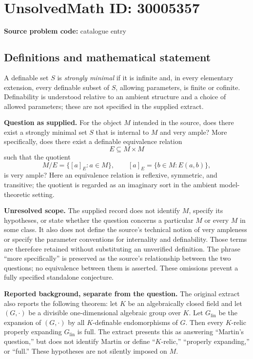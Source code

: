 \documentclass[11pt]{article}
\begin{document}
\section*{UnsolvedMath ID: 30005357}
\textbf{Source problem code:} catalogue entry
\subsection{Definitions and mathematical statement}
A definable set \(S\) is \emph{strongly minimal} if it is infinite and, in every elementary extension, every definable subset of \(S\), allowing parameters, is finite or cofinite. Definability is understood relative to an ambient structure and a choice of allowed parameters; these are not specified in the supplied extract.

\textbf{Question as supplied.} For the object \(M\) intended in the source, does there exist a strongly minimal set \(S\) that is internal to \(M\) and very ample? More specifically, does there exist a definable equivalence relation
\[
E\subseteq M\times M
\]
such that the quotient
\[
M/E=\{[a]_E:a\in M\},\qquad [a]_E=\{b\in M:E(a,b)\},
\]
is very ample? Here an equivalence relation is reflexive, symmetric, and transitive; the quotient is regarded as an imaginary sort in the ambient model-theoretic setting.

\textbf{Unresolved scope.} The supplied record does not identify \(M\), specify its hypotheses, or state whether the question concerns a particular \(M\) or every \(M\) in some class. It also does not define the source's technical notion of very ampleness or specify the parameter conventions for internality and definability. Those terms are therefore retained without substituting an unverified definition. The phrase ``more specifically'' is preserved as the source's relationship between the two questions; no equivalence between them is asserted. These omissions prevent a fully specified standalone conjecture.

\textbf{Reported background, separate from the question.} The original extract also reports the following theorem: let \(K\) be an algebraically closed field and let \((G,\cdot)\) be a divisible one-dimensional algebraic group over \(K\). Let \(G_{\mathrm{lin}}\) be the expansion of \((G,\cdot)\) by all \(K\)-definable endomorphisms of \(G\). Then every \(K\)-relic properly expanding \(G_{\mathrm{lin}}\) is full. The extract presents this as answering ``Martin's question,'' but does not identify Martin or define ``\(K\)-relic,'' ``properly expanding,'' or ``full.'' These hypotheses are not silently imposed on \(M\).
\end{document}
